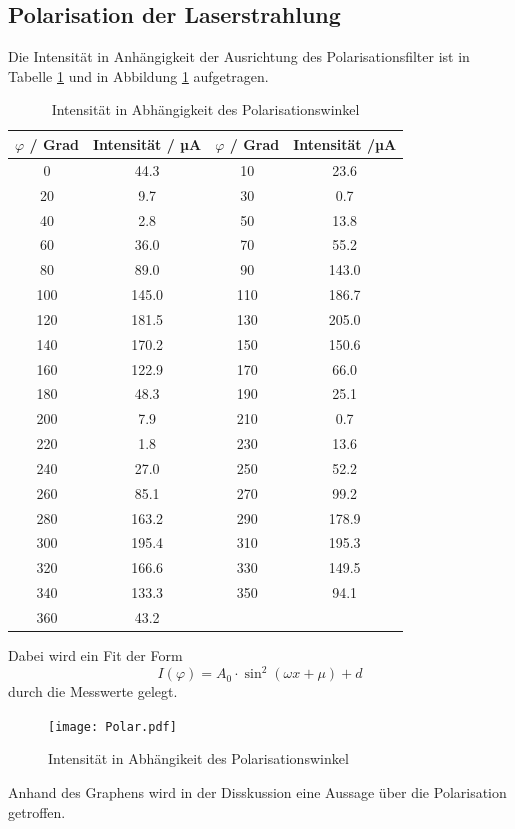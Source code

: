 \subsection{Polarisation der Laserstrahlung}
Die Intensität in Anhängigkeit der Ausrichtung des Polarisationsfilter ist in Tabelle \ref{tab:Pol} und in Abbildung \ref{fig:Pol} aufgetragen.
\begin{table}
  \centering
  \begin{tabular}{c c | c c}
    \toprule
    $\varphi$ / Grad & Intensität / µA & $\varphi$ / Grad & Intensität /µA \\
    \midrule
	0	& 44.3	& 10	& 23.6	\\
	20	& 9.7	& 30	& 0.7	\\
	40	& 2.8	& 50	& 13.8	\\
	60	& 36.0	& 70	& 55.2	\\
	80	& 89.0	& 90	& 143.0	\\
	100	& 145.0	& 110	& 186.7	\\
	120	& 181.5	& 130	& 205.0	\\
	140	& 170.2	& 150	& 150.6	\\
	160	& 122.9	& 170	& 66.0	\\
	180	& 48.3	& 190	& 25.1	\\
	200	& 7.9	& 210	& 0.7	\\
	220	& 1.8	& 230	& 13.6	\\
	240	& 27.0	& 250	& 52.2	\\
	260	& 85.1	& 270	& 99.2	\\
	280	& 163.2	& 290	& 178.9	\\
	300	& 195.4	& 310	& 195.3	\\
	320	& 166.6	& 330	& 149.5	\\
	340	& 133.3 & 350	& 94.1	\\
	360	& 43.2	\\
    \bottomrule
  \end{tabular}
  \caption{Intensität in Abhängigkeit des Polarisationswinkel}
  \label{tab:Pol}
\end{table}
Dabei wird ein Fit der Form 
\begin{equation}
  I(\varphi) = A_0 \cdot \sin^2(\omega x + \mu) + d
  \label{eqn:pfit}
\end{equation}
durch die Messwerte gelegt. 
\begin{figure}
  \centering
  \texttt{[image: Polar.pdf]}
  \caption{Intensität in Abhängikeit des Polarisationswinkel}
  \label{fig:Pol}
\end{figure}
Anhand des Graphens wird in der Disskussion eine Aussage über die Polarisation getroffen. 

